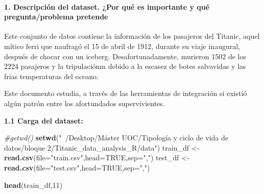 \documentclass[]{article}
\newenvironment{Shaded}{\begin{snugshade}}{\end{snugshade}}
\newcommand{\CommentTok}[1]{\textcolor[rgb]{0.56,0.35,0.01}{\textit{#1}}}
\newcommand{\DataTypeTok}[1]{\textcolor[rgb]{0.13,0.29,0.53}{#1}}
\newcommand{\DecValTok}[1]{\textcolor[rgb]{0.00,0.00,0.81}{#1}}
\newcommand{\KeywordTok}[1]{\textcolor[rgb]{0.13,0.29,0.53}{\textbf{#1}}}
\newcommand{\NormalTok}[1]{#1}
\newcommand{\OtherTok}[1]{\textcolor[rgb]{0.56,0.35,0.01}{#1}}
\newcommand{\StringTok}[1]{\textcolor[rgb]{0.31,0.60,0.02}{#1}}
\let\oldparagraph\paragraph
\renewcommand{\paragraph}[1]{\oldparagraph{#1}\mbox{}}
\begin{document}
\hypertarget{descripciuxf3n-del-dataset.-por-quuxe9-es-importante-y-quuxe9-preguntaproblema-pretende}{%
\paragraph{1. Descripción del dataset. ¿Por qué es importante y qué
pregunta/problema
pretende}\label{descripciuxf3n-del-dataset.-por-quuxe9-es-importante-y-quuxe9-preguntaproblema-pretende}}

Este conjunto de datos contiene la información de los pasajeros del
Titanic, aquel mítico ferri que naufragó el 15 de abril de 1912, durante
su viaje inaugural, después de chocar con un iceberg.
Desafortunadamente, murieron 1502 de los 2224 pasajeros y la
tripulaciónm debido a la escasez de botes salvavidas y las frias
temperaturas del oceano.

Este documento estudia, a través de las herramientas de integración si
existió algún patrón entre los afortundados supervivientes.

\textbf{1.1 Carga del dataset:}

\begin{Shaded}
\begin{Highlighting}[]
\CommentTok{#getwd()}
\KeywordTok{setwd}\NormalTok{(}\StringTok{"~/Desktop/Máster UOC/Tipología y ciclo de vida de datos/bloque 2/Titanic_data_analysis_R/data"}\NormalTok{)}
\NormalTok{train_df <-}\StringTok{ }\KeywordTok{read.csv}\NormalTok{(}\DataTypeTok{file=}\StringTok{"train.csv"}\NormalTok{,}\DataTypeTok{head=}\OtherTok{TRUE}\NormalTok{,}\DataTypeTok{sep=}\StringTok{","}\NormalTok{)}
\NormalTok{test_df <-}\StringTok{ }\KeywordTok{read.csv}\NormalTok{(}\DataTypeTok{file=}\StringTok{"test.csv"}\NormalTok{,}\DataTypeTok{head=}\OtherTok{TRUE}\NormalTok{,}\DataTypeTok{sep=}\StringTok{","}\NormalTok{)}

\KeywordTok{head}\NormalTok{(train_df,}\DecValTok{11}\NormalTok{)}
\end{Highlighting}
\end{Shaded}
\end{document}
